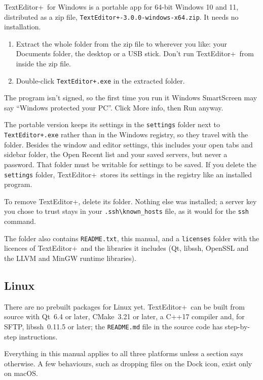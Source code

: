 \documentclass[11pt,a4paper]{article}
\newcommand{\appname}{TextEditor+}
\newcommand{\version}{3.0.0}
\newcommand{\ui}[1]{\textsf{#1}}
\begin{document}
\appname\ for Windows is a portable app for 64-bit Windows 10 and 11,
distributed as a zip file,
\texttt{TextEditor+-\version-windows-x64.zip}. It needs no installation.

\begin{enumerate}
  \item Extract the whole folder from the zip file to wherever you like: your
        Documents folder, the desktop or a USB stick. Don't run \appname\ from
        inside the zip file.
  \item Double-click \texttt{TextEditor+.exe} in the extracted folder.
\end{enumerate}

The program isn't signed, so the first time you run it Windows SmartScreen may
say ``Windows protected your PC''. Click \ui{More info}, then \ui{Run anyway}.

The portable version keeps its settings in the \texttt{settings} folder next to
\texttt{TextEditor+.exe} rather than in the Windows registry, so they travel
with the folder. Besides the window and editor settings, this includes your
open tabs and sidebar folder, the Open Recent list and your saved servers, but
never a password. That folder must be writable for settings to be saved. If you
delete the \texttt{settings} folder, \appname\ stores its settings in the
registry like an installed program.

To remove \appname, delete its folder. Nothing else was installed; a server key
you chose to trust stays in your \texttt{.ssh\textbackslash known\_hosts} file, as
it would for the \texttt{ssh} command.

The folder also contains \texttt{README.txt}, this manual, and a
\texttt{licenses} folder with the licences of \appname\ and the libraries it
includes (Qt, libssh, OpenSSL and the LLVM and MinGW runtime libraries).

\subsection{Linux}

There are no prebuilt packages for Linux yet. \appname\ can be built from
source with Qt~6.4 or later, CMake~3.21 or later, a C++17 compiler and, for
SFTP, libssh~0.11.5 or later; the
\texttt{README.md} file in the source code has step-by-step instructions.

\begin{note}
Everything in this manual applies to all three platforms unless a section says
otherwise. A few behaviours, such as dropping files on the Dock icon, exist only
on macOS.
\end{note}
\end{document}

